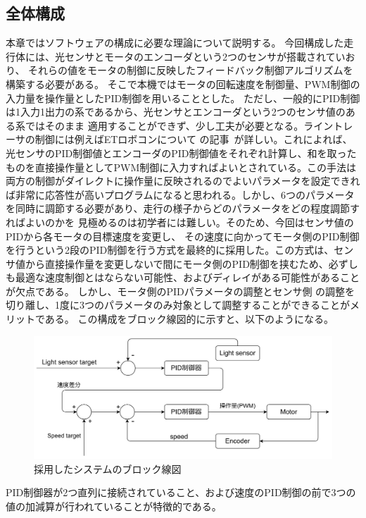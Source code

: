 \documentclass{ltjsreport}
\begin{document}
\subsection{全体構成}
本章ではソフトウェアの構成に必要な理論について説明する。
今回構成した走行体には、光センサとモータのエンコーダという2つのセンサが搭載されていおり、
それらの値をモータの制御に反映したフィードバック制御アルゴリズムを構築する必要がある。
そこで本機ではモータの回転速度を制御量、PWM制御の入力量を操作量としたPID制御を用いることとした。
ただし、一般的にPID制御は1入力1出力の系であるから、光センサとエンコーダという2つのセンサ値のある系ではそのまま
適用することができず、少し工夫が必要となる。ライントレーサの制御には例えばETロボコンについて
の記事~\cite{ETM}が詳しい。これによれば、光センサのPID制御値とエンコーダのPID制御値をそれぞれ計算し、和を取ったものを直接操作量としてPWM制御に入力すればよいとされている。この手法は両方の制御がダイレクトに操作量に反映されるのでよいパラメータを設定できれば非常に応答性が高いプログラムになると思われる。しかし、6つのパラメータを同時に調節する必要があり、走行の様子からどのパラメータをどの程度調節すればよいのかを
見極めるのは初学者には難しい。そのため、今回はセンサ値のPIDから各モータの目標速度を変更し、
その速度に向かってモータ側のPID制御を行うという2段のPID制御を行う方式を最終的に採用した。この方式は、センサ値から直接操作量を変更しないで間にモータ側のPID制御を挟むため、必ずしも最適な速度制御とはならない可能性、およびディレイがある可能性があることが欠点である。
しかし、モータ側のPIDパラメータの調整とセンサ側
の調整を切り離し、1度に3つのパラメータのみ対象として調整することができることがメリットである。
この構成をブロック線図的に示すと、以下のようになる。

\begin{figure}[H]
  \centering
  \includegraphics[keepaspectratio, scale=0.05]
       {img/block_line.drawio.png}
  \caption{採用したシステムのブロック線図}
  \label{fig:blockline}
 \end{figure}

PID制御器が2つ直列に接続されていること、および速度のPID制御の前で3つの値の加減算が行われていることが特徴的である。
\end{document}
